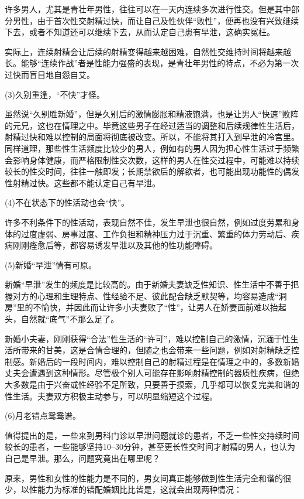 \documentclass[12pt,UTF8]{ctexbook}
\begin{document}
许多男人，尤其是青壮年男性，往往可以在一天内连续多次进行性交。但是其中部分男性，由于首次性交射精过快，而让自己及性伙伴“败性”，便再也没有兴致继续下去，或者不知道还可以继续下去，从而认定自己患有早泄，这确实冤枉。

实际上，连续射精会让后续的射精变得越来越困难，自然性交维持时间将越来越长。能够“连续作战”者是性能力强盛的表现，是青壮年男性的特点，不必为第一次过快而盲目地自怨自艾。

(3)久别重逢，“不快”才怪。

虽然说“久别胜新婚”，但是久别后的激情膨胀和精液饱满，也是让男人“快速”败阵的元兄，这也在情理之中。毕竟这些男子在经过适当的调整和后续规律性生活后，射精过快和难以控制的局面将彻底被改变。所以，不能将其打入到早泄的冷宫里。同样道理，那些性生活频度比较少的男人，例如有的男人因为担心性生活过于频繁会影响身体健康，而严格限制性交次数，这样的男人在性交过程中，可能难以持续较长的性交时间，往往一触即发；长期禁欲后的解欲者，也可能出现功能性的偶发性射精过快。这些都不能认定自己有早泄。

(4)不在状态下的性活动也会“快”。

许多不利条件下的性活动，表现自然不佳，发生早泄也很自然，例如过度劳累和身体的过度虚弱、房事过度、工作负担和精神压力过于沉重、繁重的体力劳动后、疾病刚刚痊愈后等，都容易诱发早泄以及其他的性功能障碍。

(5)新婚“早泄”情有可原。

新婚“早泄”发生的频度是比较高的。由于新婚夫妻缺乏性知识、性生活中不善于把握对方的心理和生理特点、性经验不足、彼此配合缺乏默契等，均容易造成“洞房”里的不愉快，并因此而让许多小夫妻败了“性”，让男人在娇妻面前难以抬起头，自然就“底气”不那么足了。

新婚小夫妻，刚刚获得“合法”性生活的“许可”，难以控制自己的激情，沉湎于性生活所带来的甘美，这是合情合理的，但随之也会带来一些问题，例如对射精缺乏控制感。新婚后的一段时间内，难以控制自己的射精过程是在情理之中的，多数新婚丈夫会遭遇到这种情形。尽管极个别人可能存在影响射精控制的器质性疾病，但绝大多数是由于兴奋或性经验不足所致，只要善于摸索，几乎都可以恢复完美和谐的性生活。夫妻双方积极主动参与，可以明显缩短这个过程。

(6)月老错点鸳鸯谱。

值得提出的是，一些来到男科门诊以早泄问题就诊的患者，不乏一些性交持续时间较长的患者，一些能够坚持10--30分钟，甚至更长性交时间才射精的男人，也认为自己是早泄。那么，问题究竟出在哪里呢？

原来，男性和女性的性能力是不同的，男女间真正能够做到性生活完全和谐的很少，以性能力为标准的错配婚姻比比皆是，这就会出现两种情况：
\end{document}
